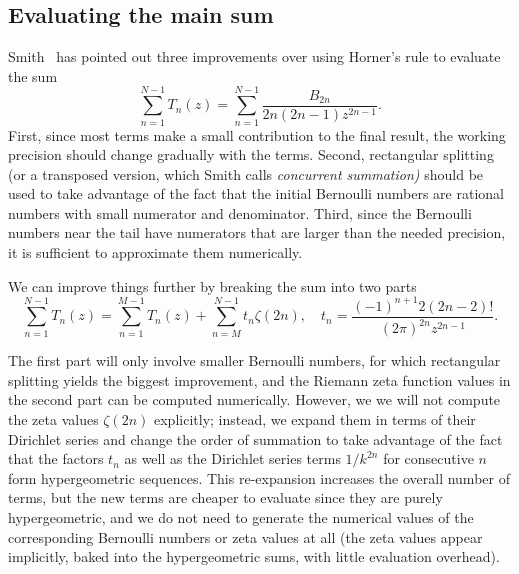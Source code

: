 \documentclass[reqno]{amsart}
\theoremstyle{definition}
\begin{document}
\subsection{Evaluating the main sum}

Smith~\cite{Smith2001} has pointed out three improvements
over using Horner's rule to evaluate the sum
\begin{equation}
\sum_{n=1}^{N-1} T_n(z) = \sum_{n=1}^{N-1} \frac{B_{2n}}{2n(2n-1) z^{2n-1}}.
\end{equation}
First, since most terms make a small contribution to the final result,
the working precision should change gradually with the terms.
Second, rectangular splitting (or a transposed version, which
Smith calls \emph{concurrent summation)} should be used to take advantage
of the fact that the initial Bernoulli numbers are rational numbers
with small numerator and denominator.
Third, since the Bernoulli numbers near the tail have numerators that are
larger than the needed precision, it is sufficient to
approximate them numerically.

We can improve things further by breaking the sum into two parts
\begin{equation}
\sum_{n=1}^{N-1} T_n(z) = \sum_{n=1}^{M-1} T_n(z) + \sum_{n=M}^{N-1} t_n \zeta(2n), \quad t_n = \frac{(-1)^{n+1} 2 (2n-2)!}{(2 \pi)^{2n} z^{2n-1}}.
\label{eq:stirlingsplit}
\end{equation}

The first part will only involve smaller Bernoulli numbers,
for which rectangular splitting yields the biggest improvement,
and the Riemann zeta function values in the second part can be computed numerically.
However, we we will not compute the zeta values $\zeta(2n)$ explicitly;
instead, we expand them in terms of their Dirichlet series and change the order of summation to take
advantage of the fact that the factors $t_n$ as well as the
Dirichlet series terms $1/k^{2n}$ for consecutive $n$ form hypergeometric sequences.
This re-expansion increases the overall number of terms, but the new terms
are cheaper to evaluate since they are purely hypergeometric,
and we do not need to generate the numerical values of the corresponding Bernoulli numbers or zeta values at all
(the zeta values appear implicitly, baked into the hypergeometric
sums, with little evaluation overhead).
\end{document}
